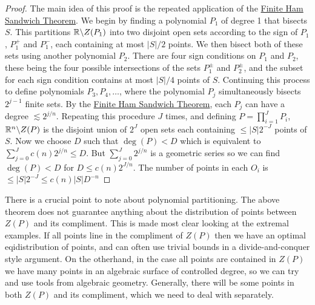  \begin{proof}
 The main idea of this proof is the repeated application of the \hyperref[thm:FiniteHamSandwich]{Finite Ham Sandwich Theorem}. We begin by finding a polynomial $P_1$ of degree 1 that bisects $S$. This partitions $\mathbb R \backslash Z(P_1)$
 into two disjoint open sets according to the sign of $P_1$, $P_1^+$ and $P_1^-$, each containing at most $|S|/2$ points.
 We then bisect both of these sets using another polynomial $P_2$.
 There are four sign conditions on $P_1$ and $P_2$, these being the four possible intersections of the sets $P_1^{\pm}$ and $P_2^{\pm}$,
 and the subset for each sign condition contains at most $|S|/4$ points of $S$. 
 Continuing this process to define polynomials $P_3, P_4, \dots$, where the polynomial $P_j$ simultaneously bisects $2^{j-1}$ finite sets. 
 By the \hyperref[thm:FiniteHamSandwich]{Finite Ham Sandwich Theorem}, each $P_j$ can have a degree
 $\lesssim 2^{j/n}$. 
 Repeating this procedure $J$ times, and defining $P = \prod_{i=1}^{J} P_i$, $\mathbb R^n \backslash Z(P)$ is the disjoint union of $2^J$ open sets each containing $ \leq |S|2^{-J}$
 points of $S$. Now we choose $D$ such that $\deg(P) < D$ which is equivalent to $\sum_{j=0}^J c(n) 2^{j/n} \leq D$. But $\sum_{j=0}^J 2^{j/n}$ is a geometric series so we can find $\deg (P) < D$ for $D \leq c(n) 2^{J/n}$. 
 The number of points in each $O_i$ is $\leq |S| 2^{-J} \leq c(n) |S| D^{-n}$
 \end{proof}

There is a crucial point to note about polynomial partitioning. 
The above theorem does not guarantee anything about the distribution of points between $Z(P)$ and its compliment.
This is made most clear looking at the extremal examples. If all points line in the compliment of $Z(P)$ then we have an optimal eqidistribution of points,
and can often use trivial bounds in a divide-and-conquer style argument. On the otherhand, in the case all points are contained in $Z(P)$ we have
many points in an algebraic surface of controlled degree, so we can try and use tools from algebraic geometry. Generally, there will be some points in both $Z(P)$ and its compliment,
which we need to deal with separately.


